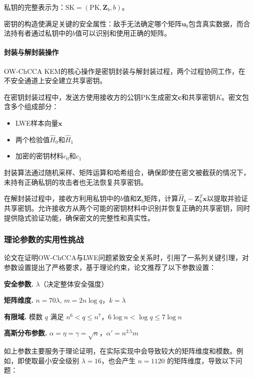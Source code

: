 私钥的完整表示为：$\mathrm{SK} = (\mathrm{PK}, \mathbf{Z}_b, b)$。

密钥的构造使满足关键的安全属性：敌手无法确定哪个矩阵$\mathbf{u}_b$包含真实数据，而合法持有者通过私钥中的$b$值可以识别和使用正确的矩阵。

\paragraph{封装与解封装操作}

OW-ChCCA KEM的核心操作是密钥封装与解封装过程，两个过程协同工作，在不安全通道上安全建立共享密钥。

在密钥封装过程中，发送方使用接收方的公钥$\mathrm{PK}$生成密文$\mathbf{c}$和共享密钥$K$。密文包含多个组成部分：
\begin{itemize}
\item LWE样本向量$\mathbf{x}$
\item 两个检验值$\hat{H}_0$和$\hat{H}_1$
\item 加密的密钥材料$c_0$和$c_1$
\end{itemize}

封装算法通过随机采样、矩阵运算和哈希组合，确保即使在密文被截获的情况下，未持有正确私钥的攻击者也无法恢复共享密钥。

在解封装过程中，接收方利用私钥中的$b$值和$\mathbf{Z}_b$矩阵，计算$\hat{H}_b - \mathbf{Z}_b^T\mathbf{x}$以提取并验证共享密钥。允许接收方从两个可能的密钥材料中识别并恢复正确的共享密钥，同时提供隐式验证功能，确保密文的完整性和真实性。

\subsubsection{理论参数的实用性挑战}

论文\cite{pan_lattice-based_2023}在证明OW-ChCCA与LWE问题紧致安全关系时，引用了一系列关键引理，对参数设置提出了严格要求，基于理论约束，论文推荐了以下参数设置：

\textbf{安全参数.} $\lambda$（决定整体安全强度）

\textbf{矩阵维度.} $n = 70\lambda$, $m = 2n\log q$，$k = \lambda$

\textbf{有限域.} 模数 $q$ 满足 $n^6 < q \leq n^7$，$6\log n< \log q \leq 7\log n$

\textbf{高斯分布参数.} $\alpha = \eta = \gamma = \sqrt{n}$，$\alpha' = n^{2.5}m$

如上参数主要服务于理论证明，在实际实现中会导致较大的矩阵维度和模数。例如，即使取最小安全级别 $\lambda = 16$，也会产生 $n = 1120$ 的矩阵维度，导致以下问题：

